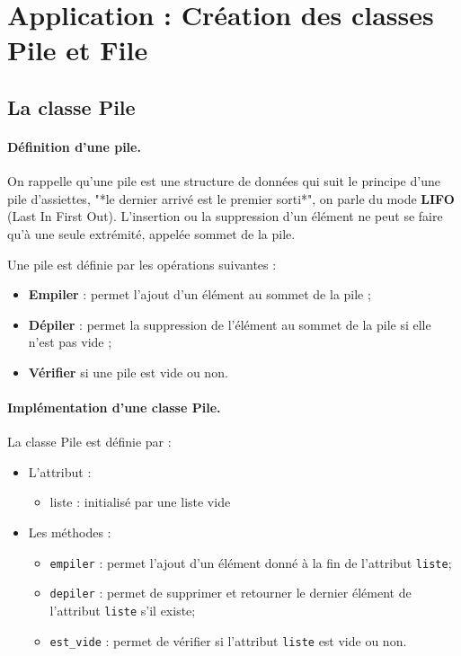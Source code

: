 \documentclass[%
oneside,                 %
final,                   %
10pt]{article}
\begin{document}
\section{Application : Création des classes Pile et File}
\subsection{La classe Pile}
\paragraph{Définition d'une pile.}
On rappelle qu'une pile est une structure de données qui suit le principe d'une pile d'assiettes, "*le dernier arrivé est le premier sorti*", on parle du mode \textbf{LIFO} (Last In First Out). L'insertion ou la suppression d'un élément ne peut se faire qu'à une seule extrémité, appelée sommet de la pile.

Une pile est définie par les opérations suivantes :
\begin{itemize}
\item \textbf{Empiler} : permet l'ajout d'un élément au sommet de la pile ;

\item \textbf{Dépiler} : permet la suppression de l'élément au sommet de la pile si elle n'est pas vide ;

\item \textbf{Vérifier} si une pile est vide ou non.
\end{itemize}

\noindent
\paragraph{Implémentation d'une classe Pile.}
La classe Pile est définie par :
\begin{itemize}
\item L'attribut :
\begin{itemize}

 \item liste : initialisé par une liste vide

\end{itemize}

\noindent
\item Les méthodes :
\begin{itemize}

 \item \texttt{empiler} : permet l'ajout d'un élément donné à la fin de l'attribut \texttt{liste};

 \item \texttt{depiler} : permet de supprimer et retourner le dernier élément de l'attribut \texttt{liste} s'il existe;

 \item \Verb!est_vide! : permet de vérifier si l'attribut \texttt{liste} est vide ou non.
\end{itemize}

\noindent
\end{itemize}
\end{document}
